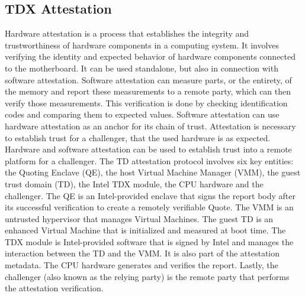 \subsection{TDX Attestation}
\label{TDX attestation}
Hardware attestation is a process that establishes the integrity and trustworthiness of hardware components in a computing system. It involves verifying the identity and expected behavior of hardware components connected to the motherboard. It can be used standalone, but also in connection with software attestation. Software attestation can measure parts, or the entirety, of the memory and report these measurements to a remote party, which can then verify those measurements\cite{stumpf}. This verification is done by checking identification codes and comparing them to expected values. Software attestation can use hardware attestation as an anchor for its chain of trust. Attestation is necessary to establish trust for a challenger, that the used hardware is as expected. Hardware and software attestation can be used to establish trust into a remote platform for a challenger.
The TD attestation protocol involves six key entities: the Quoting Enclave (QE), the host Virtual Machine Manager (VMM), the guest trust domain (TD), the Intel TDX module, the CPU hardware and the challenger. The QE is an Intel-provided enclave that signs the report body after its successful verification to create a remotely verifiable Quote. The VMM is an untrusted hypervisor that manages Virtual Machines. The guest TD is an enhanced Virtual Machine that is initialized and measured at boot time. The TDX module is Intel-provided software that is signed by Intel and manages the interaction between the TD and the VMM. It is also part of the attestation metadata. The CPU hardware generates and verifies the report. Lastly, the challenger (also known as the relying party) is the remote party that performs the attestation verification.
\label{Pre-Attestation setup}
